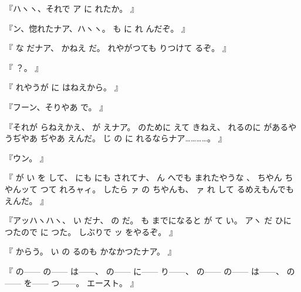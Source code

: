 『ハヽヽ、それで
ア
に
れたか。
』

『ン、惚れたナア、ハヽヽ。
も
に
れ
んだぞ。
』

『
な
だナア、
かねえ
だ。
れやがつても
りつけて
るぞ。
』

『
？。
』

『
れやうが
に
はねえから。
』

『フーン、そりやあ
で。
』

『それが
らねえかえ、
が
えナア。
のために
えて
きねえ、
れるのに
があるやうぢやあ
ぢやあ
えんだ。
じ
の
に
れるならナア…………。
』

『ウン。
』

『
が
い
を
して、
にも
にも
されてナ、
ん
へでも
まれたやうな
、
ちやん
ちやんッて
つて
れろャィ。
したら
ァ
の
ちやんも、
ァ
れ
して
るめえもんでも
えんだ。
』

『アッハヽハヽ、
い
だナ、
の
だ。
も
までになると
が
て
い。
アヽ
だ
ひに
つたので
に
つた。
しぶりで
ッ
をやるぞ。
』

『
からう。
い
の
るのも
かなかつたナア。
』

『
の------
の------
は------、
の------
に------
り------、
の------
の------
は------、
の------
を------
つ------。
エースト。
』

